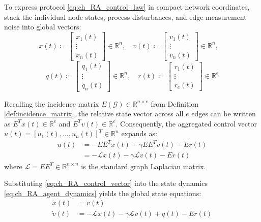 To express protocol \eqref{eq:ch_RA_control_law} in compact network coordinates, stack the individual node states, process disturbances, and edge measurement noise into global vectors:
\begin{equation}\label{eq:ch_RA_stackedstates}
	x(t) \coloneqq \begin{bmatrix} x_1(t) \\ \vdots \\ x_n(t) \end{bmatrix} \in \mathbb{R}^n, \quad 
	v(t) \coloneqq \begin{bmatrix} v_1(t) \\ \vdots \\ v_n(t) \end{bmatrix} \in \mathbb{R}^n, \quad 
\end{equation}
\begin{equation}\label{eq:ch_RA_stackednoises}
	q(t) \coloneqq \begin{bmatrix} q_1(t) \\ \vdots \\ q_n(t) \end{bmatrix} \in \mathbb{R}^n, \quad 
	r(t) \coloneqq \begin{bmatrix} r_1(t) \\ \vdots \\ r_e(t) \end{bmatrix} \in \mathbb{R}^e
\end{equation}

Recalling the incidence matrix $E(\mathcal{G}) \in \mathbb{R}^{n \times e}$ from Definition \ref{def:incidence_matrix}, the relative state vector across all $e$ edges can be written as $E^T x(t) \in \mathbb{R}^e$ and $E^T v(t) \in \mathbb{R}^e$. Consequently, the aggregated control vector $u(t) = [u_1(t), \dots, u_n(t)]^T \in \mathbb{R}^n$ expands as:
\begin{align}\label{eq:ch_RA_control_vector}
	u(t) &= -E E^T x(t) - \gamma E E^T v(t) - E r(t) \nonumber \\
	&= -\mathcal{L} x(t) - \gamma \mathcal{L} v(t) - E r(t)
\end{align}
where $\mathcal{L} = E E^T \in \mathbb{R}^{n \times n}$ is the standard graph Laplacian matrix.

Substituting \eqref{eq:ch_RA_control_vector} into the state dynamics \eqref{eq:ch_RA_agent_dynamics} yields the global state equations:
\begin{equation}\label{eq:ch_RA_global_state_eq}
	\begin{aligned}
		\dot{x}(t) &= v(t) \\
		\dot{v}(t) &= -\mathcal{L} x(t) - \gamma \mathcal{L} v(t) + q(t) - E r(t)
	\end{aligned}
\end{equation}

